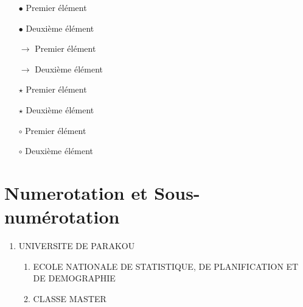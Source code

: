\documentclass[a4paper,12pt]{article} %
\begin{document}
\begin{enumerate}[label=\textbf{\arabic*.}]
\begin{itemize}
    \item[$\bullet$] Premier élément
    \item[$\bullet$] Deuxième élément
\end{itemize}
\begin{itemize}
    \item[$\rightarrow$] Premier élément
    \item[$\rightarrow$] Deuxième élément
\end{itemize}
\begin{itemize}
    \item[$\star$] Premier élément
    \item[$\star$] Deuxième élément
\end{itemize}
\begin{itemize}
    \item[$\circ$] Premier élément
    \item[$\circ$] Deuxième élément
\end{itemize}

 

\end{enumerate}

\section{Numerotation et Sous-numérotation}
\begin{enumerate}
    \item UNIVERSITE DE PARAKOU
    \begin{enumerate}
        \item ECOLE NATIONALE DE STATISTIQUE, DE PLANIFICATION ET DE DEMOGRAPHIE
        \item CLASSE MASTER
    \end{enumerate}
\end{enumerate}
\end{document}
